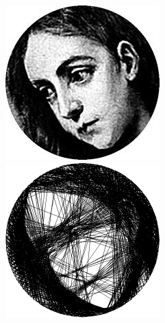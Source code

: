 \begin{figure}[H]
    \centering
    \begin{minipage}{0.2\linewidth}
        \centering
        \includegraphics[width=\linewidth]{images/lls vs radon/mary.png}
    \end{minipage}
    \begin{minipage}{0.2\linewidth}
        \centering
        \includegraphics[width=\linewidth]{images/lls vs radon/lls.png}

\end{minipage}
\end{figure}
